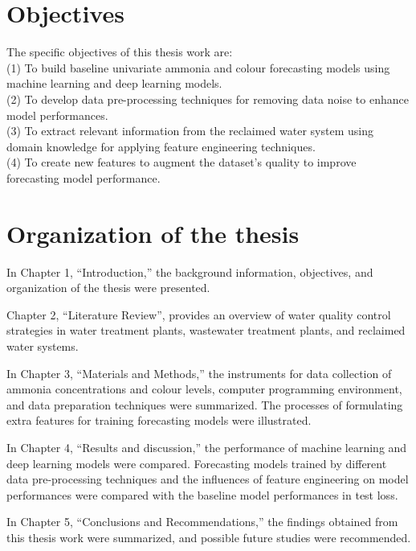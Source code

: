 \section{Objectives}
\noindent
The specific objectives of this thesis work are:\\
(1) To build baseline univariate ammonia and colour forecasting models using machine learning and deep learning models.\\
(2) To develop data pre-processing techniques for removing data noise to enhance model performances.\\
(3) To extract relevant information from the reclaimed water system using domain knowledge for applying feature engineering techniques.\\
(4) To create new features to augment the dataset's quality to improve forecasting model performance.

\section{Organization of the thesis}
In Chapter 1, “Introduction,” the background information, objectives, and organization of the thesis were presented.

Chapter 2, “Literature Review”, provides an overview of water quality control strategies in water treatment plants, wastewater treatment plants, and reclaimed water systems.

In Chapter 3, “Materials and Methods,” the instruments for data collection of ammonia concentrations and colour levels, computer programming environment, and data preparation techniques were summarized. The processes of formulating extra features for training forecasting models were illustrated.

In Chapter 4, “Results and discussion,” the performance of machine learning and deep learning models were compared. Forecasting models trained by different data pre-processing techniques and the influences of feature engineering on model performances were compared with the baseline model performances in test loss. 

In Chapter 5, “Conclusions and Recommendations,” the findings obtained from this thesis work were summarized, and possible future studies were recommended.